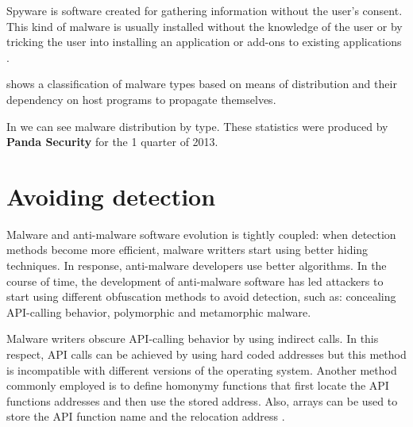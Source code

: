 Spyware is software created for gathering information without the user's consent. This kind of malware is usually installed without the knowledge of the user or by tricking the user into installing an application or add-ons to existing applications \cite{mal-behavior-analysis}.


 shows a classification of malware types based on means of distribution and their dependency on host programs to propagate themselves.


In  we can see malware distribution by type. These statistics were produced by \textbf{Panda Security} for the 1 quarter of 2013. 


\section{Avoiding detection}
\label{sec:avoid-det}

Malware and anti-malware software evolution is tightly coupled: when detection methods become more efficient, malware writters start using better hiding techniques. In response, anti-malware developers use better algorithms. In the course of time, the development of anti-malware software has led attackers to start using different obfuscation methods to avoid detection, such as: concealing API-calling behavior, polymorphic and metamorphic malware.

Malware writers obscure API-calling behavior by using indirect calls. In this respect, API calls can be achieved by using hard coded addresses but this method is incompatible with different versions of the operating system. Another method commonly employed is to define homonymy functions that first locate the API functions addresses and then use the stored address. Also, arrays can be used to store the API function name and the relocation address \cite{static-detection-behavior}.

